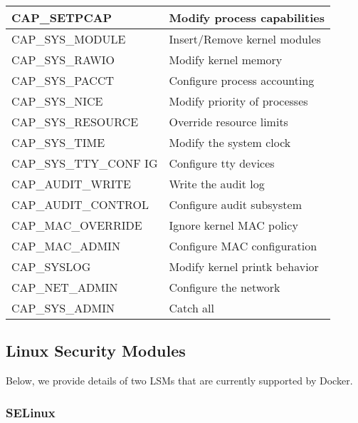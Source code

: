 \begin{center}
\tabulinesep=1.2mm
\begin{tabu} to \textwidth { | X[l] | X[l] | }
\hline
 CAP\_SETPCAP & Modify process capabilities \\
 \hline
CAP\_SYS\_MODULE & Insert/Remove kernel modules \\
 \hline
CAP\_SYS\_RAWIO & Modify kernel memory \\
 \hline
CAP\_SYS\_PACCT & Configure process accounting \\
 \hline
CAP\_SYS\_NICE &  Modify priority of processes \\
 \hline
CAP\_SYS\_RESOURCE & Override resource limits \\
 \hline
CAP\_SYS\_TIME & Modify the system clock \\
 \hline
CAP\_SYS\_TTY\_CONF IG & Configure tty devices \\
 \hline
CAP\_AUDIT\_WRITE & Write the audit log \\
 \hline
CAP\_AUDIT\_CONTROL & Configure audit subsystem \\
 \hline
CAP\_MAC\_OVERRIDE & Ignore kernel MAC policy \\
 \hline
CAP\_MAC\_ADMIN & Configure MAC configuration \\
 \hline
CAP\_SYSLOG & Modify kernel printk behavior \\
 \hline
CAP\_NET\_ADMIN & Configure the network \\
 \hline
CAP\_SYS\_ADMIN & Catch all \\
 \hline
\end{tabu}
\label{tab:capabilities}
\end{center}


\subsection{Linux Security Modules}

Below, we provide details of two LSMs that are currently
supported by Docker.

\subsubsection{SELinux}

